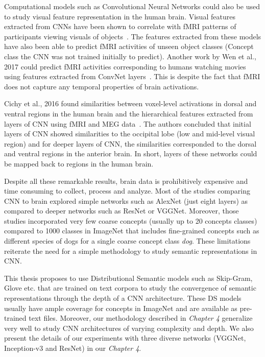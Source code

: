 Computational models such as Convolutional Neural Networks could also be used to study visual feature representation in the human brain. Visual features extracted from CNNs have been shown to correlate with fMRI patterns of participants viewing visuals of objects~\cite{BrainCNN3}. The features extracted from these models have also been able to predict fMRI activities of unseen object classes (Concept class the CNN was not trained initially to predict). Another work by Wen et al., 2017 could predict fMRI activities corresponding to humans watching movies using features extracted from ConvNet layers~\cite{BrainCNN2}. This is despite the fact that fMRI does not capture any temporal properties of brain activations.

Cichy et al., 2016 found similarities between voxel-level activations in dorsal and ventral regions in the human brain and the hierarchical features extracted from layers of CNN using fMRI and MEG data~\cite{BrainCNN1}. The authors concluded that initial layers of CNN showed similarities to the occipital lobe (low and mid-level visual region) and for deeper layers of CNN, the similarities corresponded to the dorsal and ventral regions in the anterior brain. In short, layers of these networks could be mapped back to regions in the human brain.

Despite all these remarkable results, brain data is prohibitively expensive and time consuming to collect, process and analyze. Most of the studies comparing CNN to brain explored simple networks such as AlexNet (just eight layers) as compared to deeper networks such as ResNet or VGGNet. Moreover, those studies incorporated very few coarse concepts (usually up to 20 concepts classes) compared to 1000 classes in ImageNet that includes fine-grained concepts such as different species of dogs for a single coarse concept class \textit{dog}. These limitations reiterate the need for a simple methodology to study semantic representations in CNN. 

This thesis proposes to use Distributional Semantic models such as Skip-Gram, Glove etc. that are trained on text corpora to study the convergence of semantic representations through the depth of a CNN architecture. These DS models usually have ample coverage for concepts in ImageNet and are available as pre-trained text files. Moreover, our methodology described in \textit{Chapter 4} generalize very well to study CNN architectures of varying complexity and depth. We also present the details of our experiments with three diverse networks (VGGNet, Inception-v3 and ResNet) in our \textit{Chapter 4}.

